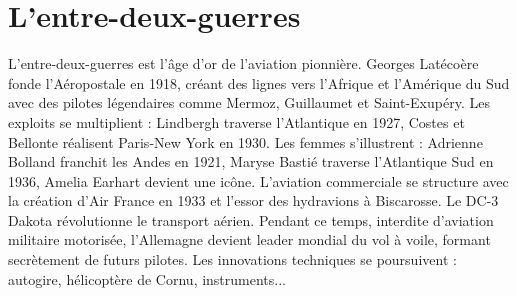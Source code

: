 \section{L'entre-deux-guerres}
L'entre-deux-guerres est l'âge d'or de l'aviation pionnière. Georges Latécoère fonde l'Aéropostale en 1918, créant des lignes vers l'Afrique et l'Amérique du Sud avec des pilotes légendaires comme Mermoz, Guillaumet et Saint-Exupéry. Les exploits se multiplient : Lindbergh traverse l'Atlantique en 1927, Costes et Bellonte réalisent Paris-New York en 1930. Les femmes s'illustrent : Adrienne Bolland franchit les Andes en 1921, Maryse Bastié traverse l'Atlantique Sud en 1936, Amelia Earhart devient une icône. L'aviation commerciale se structure avec la création d'Air France en 1933 et l'essor des hydravions à Biscarosse. Le DC-3 Dakota révolutionne le transport aérien. Pendant ce temps, interdite d'aviation militaire motorisée, l'Allemagne devient leader mondial du vol à voile, formant secrètement de futurs pilotes. Les innovations techniques se poursuivent : autogire, hélicoptère de Cornu, instruments...
